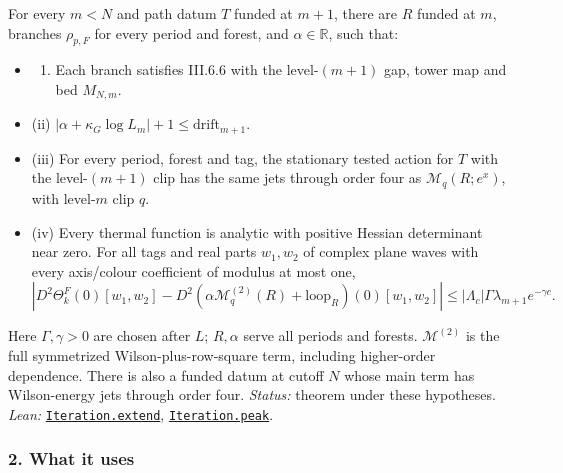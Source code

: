 \documentclass[
  letterpaper,
  11pt]{article}
\providecommand{\tightlist}{%
  \setlength{\itemsep}{0pt}\setlength{\parskip}{0pt}}
\begin{document}
For every \(m<N\) and path datum \(T\) funded at \(m+1\), there are
\(R\) funded at \(m\), branches \(\rho_{p,F}\) for every period and
forest, and \(\alpha\in\mathbb R\), such that:

\begin{itemize}
\tightlist
\item
  \begin{enumerate}
  \def\labelenumi{(\roman{enumi})}
  \tightlist
  \item
    Each branch satisfies III.6.6 with the level-\((m+1)\) gap, tower
    map and bed \(M_{N,m}\).
  \end{enumerate}
\item
  (ii) \(|\alpha+\kappa_G\log L_m|+1\le\mathrm{drift}_{m+1}\).
\item
  (iii) For every period, forest and tag, the stationary tested action
  for \(T\) with the level-\((m+1)\) clip has the same jets through
  order four as \(\mathcal M_q(R;e^x)\), with level-\(m\) clip \(q\).
\item
  (iv) Every thermal function is analytic with positive Hessian
  determinant near zero. For all tags and real parts \(w_1,w_2\) of
  complex plane waves with every axis/colour coefficient of modulus at
  most one,
  \[|D^2\Theta^F_k(0)[w_1,w_2]-D^2(\alpha\mathcal M_q^{(2)}(R)+\mathrm{loop}_R)(0)[w_1,w_2]|\le|\Lambda_c|\Gamma\lambda_{m+1}e^{-\gamma c}.\]
\end{itemize}

Here \(\Gamma,\gamma>0\) are chosen after \(L\); \(R,\alpha\) serve all
periods and forests. \(\mathcal M^{(2)}\) is the full symmetrized
Wilson-plus-row-square term, including higher-order dependence. There is
also a funded datum at cutoff \(N\) whose main term has Wilson-energy
jets through order four. \emph{Status:} theorem under these hypotheses.
\emph{Lean:}
\href{https://github.com/yang-mills-group/OpenAI-YM-20261028/blob/3456e5e75cf8d4cd558955a5c7638fba2d68f464/YM/Extra/ITERATION_NO_LOSS/Mechanism.lean\#L115-L150}{\texttt{Iteration.extend}},
\href{https://github.com/yang-mills-group/OpenAI-YM-20261028/blob/3456e5e75cf8d4cd558955a5c7638fba2d68f464/YM/Extra/ITERATION_NO_LOSS/Mechanism.lean\#L35-L48}{\texttt{Iteration.peak}}.

\subsubsection{2. What it uses}\label{what-it-uses-8}
\end{document}
